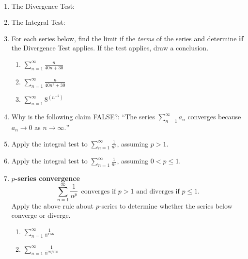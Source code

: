 \documentclass[11pt,fleqn]{article}
\begin{document}
\renewcommand{\headrulewidth}{0pt}
\newcommand{\blank}[1]{\rule{#1}{0.75pt}}
\newcommand{\bc}{\begin{center}}
\newcommand{\ec}{\end{center}}


\vspace*{-0.7in}

\begin{center}
  \large
  \\
   
\end{center}
\begin{enumerate}
\item The Divergence Test:
\vspace{1.0in}
\item The Integral Test:
\vspace{3.0in}
\item For each series below, find the limit if the \emph{terms} of the series and determine \textbf{if} the Divergence Test applies. If the test applies, draw a conclusion. 
	\begin{enumerate}
	\item $\displaystyle{\sum_{n=1}^\infty \frac{n}{40n+30}}$
	\vfill
	\item $\displaystyle{\sum_{n=1}^\infty \frac{n}{40n^2+30}}$
	\vfill
	\item $\displaystyle{\sum_{n=1}^\infty 8^{(n^{-2})} }$
	\vfill
	\end{enumerate}

\clearpage\newpage
\item Why is the following claim FALSE?: \quad ``The series $\displaystyle{\sum_{n=1}^\infty a_n}$ converges because $a_n \to 0$ as $n \to \infty.$''
\vspace{1.0in}

\item Apply the integral test to $\displaystyle \sum_{n=1}^\infty \frac{1}{n^p}$, assuming $p>1$.
\vfill

\item Apply the integral test to $\displaystyle \sum_{n=1}^\infty \frac{1}{n^p}$, assuming $0 < p \le 1$.
\vfill

\item \textbf{$p$-series convergence}
   $$\sum_{n=1}^\infty \frac{1}{n^p} \,\text{ converges if } p>1 \text{ and diverges if } p\le 1.$$
Apply the above rule about $p$-series to determine whether the series below converge or diverge.
	\begin{enumerate}
	\item  $\displaystyle{\sum_{n=1}^\infty \frac{1}{n^{1.56}}}$
	\vspace{.3in}
	\item  $\displaystyle{\sum_{n=1}^\infty \frac{1}{n^{99/100}}}$
	\vspace{.3in}
	\end{enumerate}


\end{enumerate}
\end{document}
